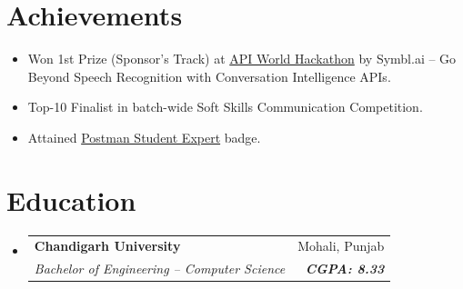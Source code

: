 \documentclass[apaper,10pt]{article}
\makeatletter
\newcommand{\MYhref}[3][primaryColor]{\href{#2}{{\color{#1}#3}}}
\newcommand{\resumeSubheading}[4]{
  \vspace{-1pt}\item
    \begin{tabular*}{0.97\textwidth}{l@{\extracolsep{\fill}}r}
      \textbf{#1} & #2 \\
      \textit{\small#3} & \textit{\small #4} \\
    \end{tabular*}\vspace{-5pt}
}
\newcommand{\resumeSubHeadingListStart}{\begin{itemize}[leftmargin=*]}
\newcommand{\resumeSubHeadingListEnd}{\end{itemize}}
\makeatother
\begin{document}
\section{Achievements}
\begin{itemize}[labelsep=*,label=$\circ$,leftmargin=0.9pc,topsep=0pt,itemsep=-1pt]
  \item\small{Won 1st Prize (Sponsor's Track) at \MYhref{https://devpost.com/software/feedback-prime-kbg8um}{API World Hackathon} by Symbl.ai -- Go Beyond Speech Recognition with Conversation Intelligence APIs.}
  \item\small{Top-10 Finalist in batch-wide Soft Skills Communication Competition.}
  \item\small{Attained \MYhref{https://badgr.com/public/assertions/DNG85AU6SYWaX6XO5gkoDw?identity__email=nitish.sharma1186@gmail.com}{Postman Student Expert} badge.}
\end{itemize}

\vspace{-2pt}

\section{Education}
\resumeSubHeadingListStart
\resumeSubheading
  {Chandigarh University}{Mohali, Punjab}
  {Bachelor of Engineering -- Computer Science}{\textbf{CGPA: 8.33}}
\resumeSubHeadingListEnd
\end{document}
